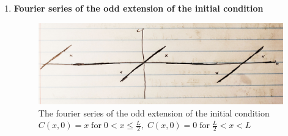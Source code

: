 \documentclass[12pt]{article}
\begin{document}
\begin{enumerate}
\begin{enumerate}
            \item \textbf{Fourier series of the odd extension of the initial condition}
            \begin{figure}[H]
                \begin{center}
                       \includegraphics[width=.65\textwidth]{OddFourier.jpg}
                       \caption{The fourier series of the odd extension of the initial condition $C(x,0)=x\;\text{for}\; 0<x\leq\frac{L}{2},\;C(x,0)=0\;\text{for}\; \frac{L}{2}<x<L$}
                       \label{fig:OddFourier}
                    \end{center}
                \end{figure}
                
        \end{enumerate}


\end{enumerate}
\end{document}
